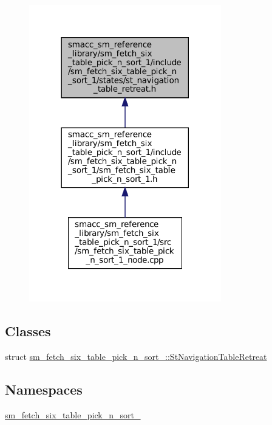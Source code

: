 \begin{figure}[H]
\begin{center}
\leavevmode
\includegraphics[width=237pt]{sm__fetch__six__table__pick__n__sort__1_2include_2sm__fetch__six__table__pick__n__sort__1_2state09546cc99d7f35a8d58a7fb9da134c12}
\end{center}
\end{figure}
\subsection*{Classes}
\begin{DoxyCompactItemize}
\item 
struct \hyperlink{structsm__fetch__six__table__pick__n__sort__1_1_1StNavigationTableRetreat}{sm\+\_\+fetch\+\_\+six\+\_\+table\+\_\+pick\+\_\+n\+\_\+sort\+\_\+::\+St\+Navigation\+Table\+Retreat}
\end{DoxyCompactItemize}
\subsection*{Namespaces}
\begin{DoxyCompactItemize}
\item 
 \hyperlink{namespacesm__fetch__six__table__pick__n__sort__1}{sm\+\_\+fetch\+\_\+six\+\_\+table\+\_\+pick\+\_\+n\+\_\+sort\+\_}
\end{DoxyCompactItemize}
